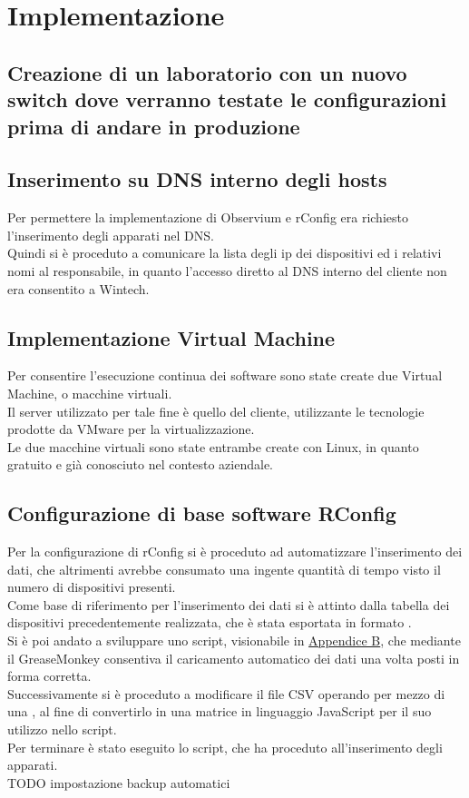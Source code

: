 \documentclass[Realizzazione.tex]{subfiles}
\begin{document}
\section{Implementazione}

\subsection{Creazione di un laboratorio con un nuovo switch dove verranno testate le configurazioni prima di andare in produzione}

\subsection{Inserimento su DNS interno degli hosts} 
Per permettere la implementazione di Observium e rConfig era richiesto l'inserimento degli apparati nel DNS. \\
Quindi si è proceduto a comunicare la lista degli ip dei dispositivi ed i relativi nomi al responsabile, in quanto l'accesso diretto al DNS interno del cliente non era consentito a Wintech.

\subsection{Implementazione Virtual Machine}
Per consentire l'esecuzione continua dei software sono state create due Virtual Machine, o macchine virtuali.\\
Il server utilizzato per tale fine è quello del cliente, utilizzante le tecnologie prodotte da VMware per la virtualizzazione. \\
Le due macchine virtuali sono state entrambe create con Linux, in quanto gratuito e già conosciuto nel contesto aziendale.

\subsection{Configurazione di base software RConfig}
Per la configurazione di rConfig si è proceduto ad automatizzare l'inserimento dei dati, che altrimenti avrebbe consumato una ingente quantità di tempo visto il numero di dispositivi presenti. \\
Come base di riferimento per l'inserimento dei dati si è attinto dalla tabella dei dispositivi 
precedentemente realizzata, che è stata esportata in formato .\\
Si è poi andato a sviluppare uno script, visionabile in \hyperref[sec:Appendice B]{Appendice B}, che mediante il GreaseMonkey consentiva il caricamento automatico dei dati una volta posti in forma corretta. \\
Successivamente si è proceduto a modificare il file CSV operando per mezzo di una , al fine di convertirlo in una matrice in linguaggio JavaScript per il suo utilizzo nello script. \\
Per terminare è stato eseguito lo script, che ha proceduto all'inserimento degli apparati. \\
TODO impostazione backup automatici
\end{document}
